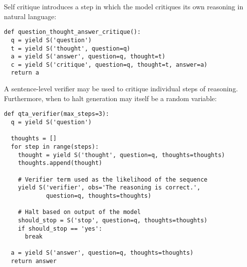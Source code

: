 Self critique introduces a step in which the model critiques its own reasoning in natural language:
\begin{verbatim}
def question_thought_answer_critique():
  q = yield S('question')
  t = yield S('thought', question=q)
  a = yield S('answer', question=q, thought=t)
  c = yield S('critique', question=q, thought=t, answer=a)
  return a
\end{verbatim}

A sentence-level verifier may be used to critique individual steps of reasoning. Furthermore, when to halt generation may itself be a random variable:

\begin{verbatim}
def qta_verifier(max_steps=3):
  q = yield S('question')

  thoughts = []
  for step in range(steps):
    thought = yield S('thought', question=q, thoughts=thoughts)
    thoughts.append(thought)

    # Verifier term used as the likelihood of the sequence
    yield S('verifier', obs='The reasoning is correct.',
            question=q, thoughts=thoughts)

    # Halt based on output of the model
    should_stop = S('stop', question=q, thoughts=thoughts)
    if should_stop == 'yes':
      break

  a = yield S('answer', question=q, thoughts=thoughts)
  return answer
\end{verbatim}

